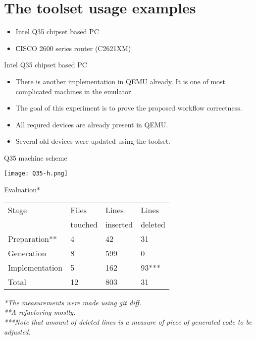 \documentclass[unicode,hyperref={unicode=true},aspectratio=169]{beamer}
\newcommand*{\sectionpagekb}{\usebeamertemplate*{section page kb}}
\begin{document}
\section{The toolset usage examples}
\begin{frame}
\sectionpagekb
\begin{itemize}
\item Intel Q35 chipset based PC
\item СISCO 2600 series router (C2621XM)
\end{itemize}
\end{frame}



\begin{frame}{Intel Q35 chipset based PC}
\begin{itemize}
\item There is another implementation in QEMU already. It is one of most
complicated machines in the emulator.
\item The goal of this experiment is to prove the proposed workflow correctness.
\item All requred devices are already present in QEMU.
\item Several old devices were updated using the toolset.
\end{itemize}
\end{frame}



\begin{frame}{Q35 machine scheme}
\begin{center}
\texttt{[image: Q35-h.png]}
\end{center}
\end{frame}



\begin{frame}{Evaluation*}
\begin{center}
\begin{tabular}{l|lll}
Stage          & Files     & Lines     & Lines   \\
               & touched   & inserted  & deleted \\
\hline
Preparation**  & 4         & 42        & 31      \\
Generation     & 8         & 599       & 0       \\
Implementation & 5         & 162       & 93***   \\
Total          & 12        & 803       & 31      \\
\end{tabular}
\end{center}
\vfill
\it{*The measurements were made using git diff.} \\
\it{**A refactoring mostly.}\\
\it{***Note that amount of deleted lines is a measure of piece of generated
code to be adjusted.}\\
\end{frame}
\end{document}
